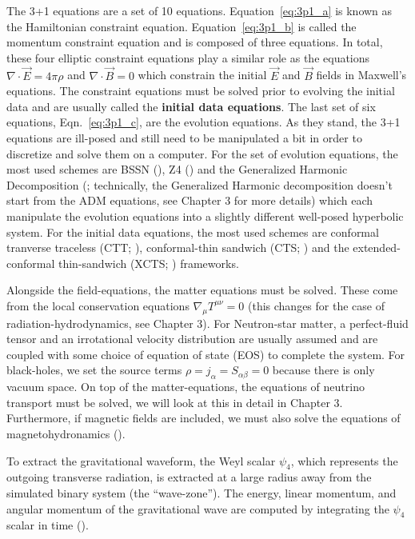 The 3+1 equations are a set of 10 equations. Equation~\ref{eq:3p1_a} is known as the Hamiltonian constraint equation. Equation~\ref{eq:3p1_b} is called the momentum constraint equation and is composed of three equations. In total, these four elliptic constraint equations play a similar role as the equations $\nabla \cdot \vec E = 4\pi\rho$ and $\nabla \cdot \vec B = 0$ which constrain the initial $\vec E$ and $\vec B$ fields in Maxwell's equations. The constraint equations must be solved prior to evolving the initial data and are usually called the \textbf{initial data equations}. The last set of six equations, Eqn.~\ref{eq:3p1_c}, are the evolution equations. As they stand, the 3+1 equations are ill-posed and still need to be manipulated a bit in order to discretize and solve them on a computer. For the set of evolution equations, the most used schemes are BSSN (\cite{baumgarte1998numerical,shibata1995evolution}), Z4 (\cite{bona2003general}) and the Generalized Harmonic Decomposition (\cite{pretorius2005numerical}; technically, the Generalized Harmonic decomposition doesn't start from the ADM equations, see Chapter 3 for more details) which each manipulate the evolution equations into a slightly different well-posed hyperbolic system. For the initial data equations, the most used schemes are conformal tranverse traceless (CTT; \cite{bowen1980time}), conformal-thin sandwich (CTS; \cite{york1999conformal}) and the extended-conformal thin-sandwich (XCTS; \cite{pfeiffer-york:2005}) frameworks.

Alongside the field-equations, the matter equations must be solved. These come from the local conservation equations $\nabla_{\mu}T^{\mu\nu} = 0$ (this changes for the case of radiation-hydrodynamics, see Chapter 3). For Neutron-star matter, a perfect-fluid tensor and an irrotational velocity distribution are usually assumed and are coupled with some choice of equation of state (EOS) to complete the system\cite{faber2012binary}. For black-holes, we set the source terms $\rho = j_{\alpha} = S_{\alpha\beta} = 0$ because there is only vacuum space. On top of the matter-equations, the equations of neutrino transport must be solved, we will look at this in detail in Chapter 3. Furthermore, if magnetic fields are included, we must also solve the equations of magnetohydronamics (\cite{baumgarte2003general,shibata2012radiation}).

To extract the gravitational waveform, the Weyl scalar $\psi_{4}$, which represents the outgoing transverse radiation, is extracted at a large radius away from the simulated binary system (the ``wave-zone''). The energy, linear momentum, and angular momentum of the gravitational wave are computed by integrating the $\psi_{4}$ scalar in time (\cite{kyutoku2015dynamical}).

